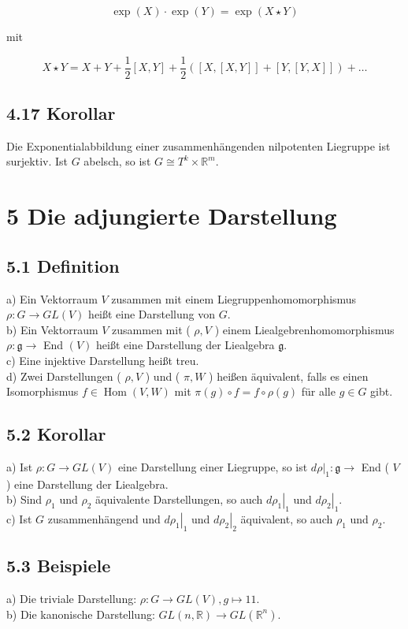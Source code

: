 \documentclass[10pt, letterpaper]{article}
\begin{document}
$$
\exp (X) \cdot \exp (Y)=\exp (X \star Y)
$$

mit

$$
X \star Y=X+Y+\frac{1}{2}[X, Y]+\frac{1}{2}([X,[X, Y]]+[Y,[Y, X]])+\ldots
$$

\subsection*{4.17 Korollar}
Die Exponentialabbildung einer zusammenhängenden nilpotenten Liegruppe ist surjektiv. Ist $G$ abelsch, so ist $G \cong T^{k} \times \mathbb{R}^{m}$.

\section*{5 Die adjungierte Darstellung}
\subsection*{5.1 Definition}
a) Ein Vektorraum $V$ zusammen mit einem Liegruppenhomomorphismus $\rho: G \rightarrow G L(V)$ heißt eine Darstellung von $G$.\\
b) Ein Vektorraum $V$ zusammen mit ( $\rho, V$ ) einem Liealgebrenhomomorphismus $\rho: \mathfrak{g} \rightarrow$ End $(V)$ heißt eine Darstellung der Liealgebra $\mathfrak{g}$.\\
c) Eine injektive Darstellung heißt treu.\\
d) Zwei Darstellungen ( $\rho, V$ ) und ( $\pi, W$ ) heißen äquivalent, falls es einen Isomorphismus $f \in \operatorname{Hom}(V, W)$ mit $\pi(g) \circ f=f \circ \rho(g)$ für alle $g \in G$ gibt.

\subsection*{5.2 Korollar}
a) Ist $\rho: G \rightarrow G L(V)$ eine Darstellung einer Liegruppe, so ist $\left.d \rho\right|_{1}: \mathfrak{g} \rightarrow$ End ( $V$ ) eine Darstellung der Liealgebra.\\
b) Sind $\rho_{1}$ und $\rho_{2}$ äquivalente Darstellungen, so auch $\left.d \rho_{1}\right|_{1}$ und $\left.d \rho_{2}\right|_{1}$.\\
c) Ist $G$ zusammenhängend und $\left.d \rho_{1}\right|_{1}$ und $\left.d \rho_{2}\right|_{2}$ äquivalent, so auch $\rho_{1}$ und $\rho_{2}$.

\subsection*{5.3 Beispiele}
a) Die triviale Darstellung: $\rho: G \rightarrow G L(V), g \mapsto 11$.\\
b) Die kanonische Darstellung: $G L(n, \mathbb{R}) \rightarrow G L\left(\mathbb{R}^{n}\right)$.
\end{document}
